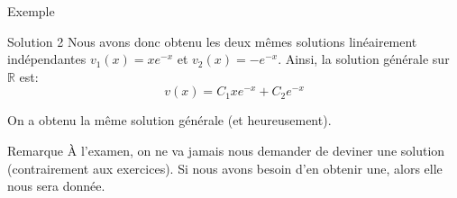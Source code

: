 \documentclass[a4paper]{article}
\begin{document}
\begin{parag}{Exemple}
\begin{subparag}{Solution 2}
        Nous avons donc obtenu les deux mêmes solutions linéairement indépendantes $v_1\left(x\right) = xe^{-x}$ et $v_2\left(x\right) = -e^{-x}$. Ainsi, la solution générale sur $\mathbb{R}$ est: 
        \[v\left(x\right) = C_1 x e^{-x} + C_2e^{-x}\]

        On a obtenu la même solution générale (et heureusement).
    \end{subparag}

    \begin{subparag}{Remarque}
        À l'examen, on ne va jamais nous demander de deviner une solution (contrairement aux exercices). Si nous avons besoin d'en obtenir une, alors elle nous sera donnée.
    \end{subparag}
    
\end{parag}
\end{document}
